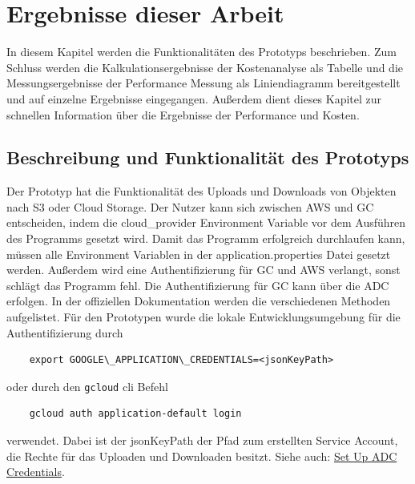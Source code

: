\chapter{Ergebnisse dieser Arbeit}

In diesem Kapitel werden die Funktionalitäten des Prototyps beschrieben. Zum Schluss werden die Kalkulationsergebnisse der Kostenanalyse als Tabelle und die Messungsergebnisse der Performance Messung als Liniendiagramm bereitgestellt und auf einzelne Ergebnisse eingegangen. Außerdem dient dieses Kapitel zur schnellen Information über die Ergebnisse der Performance und Kosten. 

\section{Beschreibung und Funktionalität des Prototyps}

Der Prototyp hat die Funktionalität des Uploads und Downloads von Objekten nach S3 oder Cloud Storage. Der Nutzer kann sich zwischen AWS und GC entscheiden, indem die cloud\_provider Environment Variable vor dem Ausführen des Programms gesetzt wird. Damit das Programm erfolgreich durchlaufen kann, müssen alle Environment Variablen in der application.properties Datei gesetzt werden. Außerdem wird eine Authentifizierung für GC und AWS verlangt, sonst schlägt das Programm fehl. Die Authentifizierung für GC kann über die ADC erfolgen. In der offiziellen Dokumentation werden die verschiedenen Methoden aufgelistet. Für den Prototypen wurde die lokale Entwicklungsumgebung für die Authentifizierung durch 

	\begin{lstlisting}
	export GOOGLE\_APPLICATION\_CREDENTIALS=<jsonKeyPath>
	\end{lstlisting}
	
	oder durch den \verb|gcloud| cli Befehl 
	
	\begin{lstlisting}
	gcloud auth application-default login
	\end{lstlisting}
	
	verwendet. Dabei ist der jsonKeyPath der Pfad zum erstellten Service Account, die Rechte für das Uploaden und Downloaden besitzt. Siehe auch: \href{https://cloud.google.com/docs/authentication/provide-credentials-adc}{Set Up ADC Credentials}.\\
	
